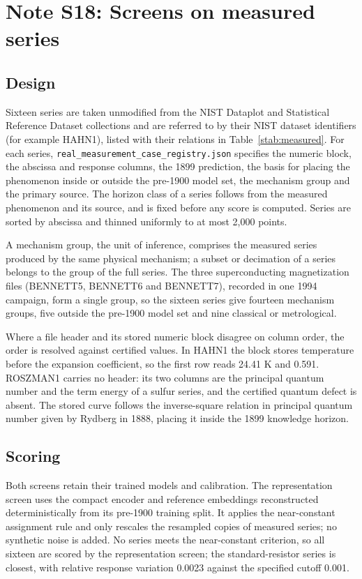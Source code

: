 \documentclass{article}
\begin{document}
\section{Note S18: Screens on measured series}

\subsection{Design}

Sixteen series are taken unmodified from the NIST Dataplot and Statistical Reference Dataset collections and are referred to by their NIST dataset identifiers (for example HAHN1), listed with their relations in Table~\ref{stab:measured}. For each series, \nolinkurl{real_measurement_case_registry.json} specifies the numeric block, the abscissa and response columns, the 1899 prediction, the basis for placing the phenomenon inside or outside the pre-1900 model set, the mechanism group and the primary source. The horizon class of a series follows from the measured phenomenon and its source, and is fixed before any score is computed. Series are sorted by abscissa and thinned uniformly to at most 2,000 points.

A mechanism group, the unit of inference, comprises the measured series produced by the same physical mechanism; a subset or decimation of a series belongs to the group of the full series. The three superconducting magnetization files (BENNETT5, BENNETT6 and BENNETT7), recorded in one 1994 campaign, form a single group, so the sixteen series give fourteen mechanism groups, five outside the pre-1900 model set and nine classical or metrological.

Where a file header and its stored numeric block disagree on column order, the order is resolved against certified values. In HAHN1 the block stores temperature before the expansion coefficient, so the first row reads 24.41 K and 0.591. ROSZMAN1 carries no header: its two columns are the principal quantum number and the term energy of a sulfur series, and the certified quantum defect is absent. The stored curve follows the inverse-square relation in principal quantum number given by Rydberg in 1888, placing it inside the 1899 knowledge horizon.

\subsection{Scoring}

Both screens retain their trained models and calibration. The representation screen uses the compact encoder and reference embeddings reconstructed deterministically from its pre-1900 training split. It applies the near-constant assignment rule and only rescales the resampled copies of measured series; no synthetic noise is added. No series meets the near-constant criterion, so all sixteen are scored by the representation screen; the standard-resistor series is closest, with relative response variation 0.0023 against the specified cutoff 0.001.
\end{document}

